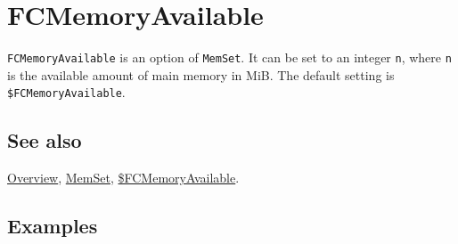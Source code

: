 \documentclass[../FeynCalcManual.tex]{subfiles}
\begin{document}
\hypertarget{fcmemoryavailable}{%
\section{FCMemoryAvailable}\label{fcmemoryavailable}}

\texttt{FCMemoryAvailable} is an option of \texttt{MemSet}. It can be
set to an integer \texttt{n}, where \texttt{n} is the available amount
of main memory in MiB. The default setting is
\texttt{\$FCMemoryAvailable}.

\subsection{See also}

\hyperlink{toc}{Overview}, \hyperlink{memset}{MemSet},
\hyperlink{fcmemoryavailable}{\$FCMemoryAvailable}.

\subsection{Examples}
\end{document}
